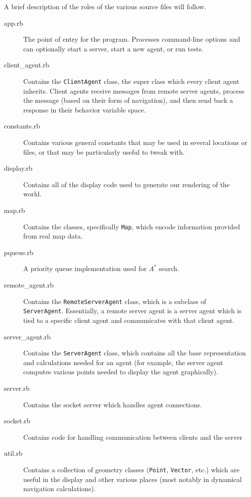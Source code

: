 \documentclass{article}
\newcommand{\code}{\texttt}
\begin{document}
A brief description of the roles of the various source files will follow.

\begin{description}
\item[app.rb] The point of entry for the program. Processes
  command-line options and can optionally start a server, start a new
  agent, or run tests.

\item[client\_agent.rb] Contains the \code{ClientAgent} class, the
  super class which every client agent inherits. Client agents receive
  messages from remote server agents, process the message (based on
  their form of navigation), and then send back a response in their
  behavior variable space.

\item[constants.rb] Contains various general constants that may be
  used in several locations or files, or that may be particularly useful to
  tweak with.

\item[display.rb] Contains all of the display code used to generate
  our rendering of the world.

\item[map.rb] Contains the classes, specifically \code{Map}, which
  encode information provided from real map data.

\item[pqueue.rb] A priority queue implementation used for $A^*$ search.

\item[remote\_agent.rb] Contains the \code{RemoteServerAgent} class,
  which is a subclass of \code{ServerAgent}. Essentially, a remote
  server agent is a server agent which is tied to a specific client
  agent and communicates with that client agent.

\item[server\_agent.rb] Contains the \code{ServerAgent} class, which
  contains all the base representation and calculations needed for an agent (for
  example, the server agent computes various points needed to display the agent
  graphically).

\item[server.rb] Contains the socket server which handles agent connections.

\item[socket.rb] Contains code for handling communication between
  clients and the server

\item[util.rb] Contains a collection of geometry classes
  (\code{Point}, \code{Vector}, etc.) which are useful in the display
  and other various places (most notably in dynamical navigation
  calculations).


\end{description}
\end{document}
